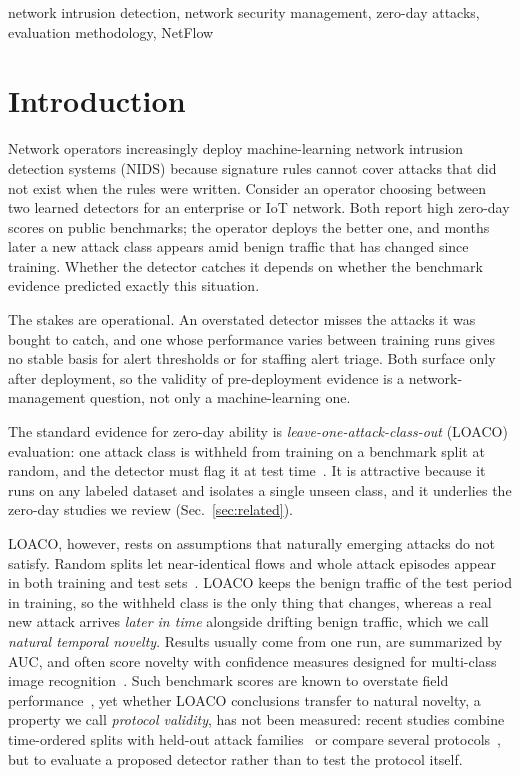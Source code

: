 \documentclass[conference]{IEEEtran}
\begin{document}
\begin{IEEEkeywords}
network intrusion detection, network security management, zero-day attacks, evaluation methodology, NetFlow
\end{IEEEkeywords}

\section{Introduction}
\label{sec:intro}
Network operators increasingly deploy machine-learning network intrusion detection systems (NIDS) because signature rules cannot cover attacks that did not exist when the rules were written. Consider an operator choosing between two learned detectors for an enterprise or IoT network. Both report high zero-day scores on public benchmarks; the operator deploys the better one, and months later a new attack class appears amid benign traffic that has changed since training. Whether the detector catches it depends on whether the benchmark evidence predicted exactly this situation.

The stakes are operational. An overstated detector misses the attacks it was bought to catch, and one whose performance varies between training runs gives no stable basis for alert thresholds or for staffing alert triage. Both surface only after deployment, so the validity of pre-deployment evidence is a network-management question, not only a machine-learning one.

The standard evidence for zero-day ability is \emph{leave-one-attack-class-out} (LOACO) evaluation: one attack class is withheld from training on a benchmark split at random, and the detector must flag it at test time~\cite{wilkie2026}. It is attractive because it runs on any labeled dataset and isolates a single unseen class, and it underlies the zero-day studies we review (Sec.~\ref{sec:related}).

LOACO, however, rests on assumptions that naturally emerging attacks do not satisfy. Random splits let near-identical flows and whole attack episodes appear in both training and test sets~\cite{arp2022}. LOACO keeps the benign traffic of the test period in training, so the withheld class is the only thing that changes, whereas a real new attack arrives \emph{later in time} alongside drifting benign traffic, which we call \emph{natural temporal novelty}. Results usually come from one run, are summarized by AUC, and often score novelty with confidence measures designed for multi-class image recognition~\cite{hendrycks2017,liu2020energy}. Such benchmark scores are known to overstate field performance~\cite{sommer2010,apruzzese2023sok}, yet whether LOACO conclusions transfer to natural novelty, a property we call \emph{protocol validity}, has not been measured: recent studies combine time-ordered splits with held-out attack families~\cite{nayak2026,alhalangy2026} or compare several protocols~\cite{mesca2026,raj2026}, but to evaluate a proposed detector rather than to test the protocol itself.
\end{document}
